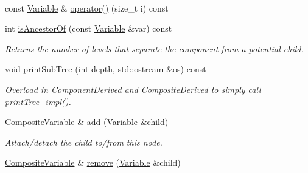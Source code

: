 \begin{DoxyCompactItemize}
$$\item 
const \hyperlink{classocra_1_1Variable}{Variable} \& \hyperlink{classocra_1_1CompositeVariable_ae539d99db2156258b02f6cf4474f2d94}{operator()} (size\+\_\+t i) const
\item 
int \hyperlink{classocra_1_1CompositeVariable_a6601ac71bdd683d06a7a6bfe4fa7252c}{is\+Ancestor\+Of} (const \hyperlink{classocra_1_1Variable}{Variable} \&var) const
\begin{DoxyCompactList}\small\item\em Returns the number of levels that separate the component from a potential child. \end{DoxyCompactList}\item 
void \hyperlink{classocra_1_1CompositeVariable_ac2015499d8f01ee39ef7bfbe33363a10}{print\+Sub\+Tree} (int depth, std\+::ostream \&os) const
\begin{DoxyCompactList}\small\item\em Overload in Component\+Derived and Composite\+Derived to simply call \hyperlink{classocra_1_1Composite_a99934c9b17849dd55075c4c773008dae}{print\+Tree\+\_\+impl()}. \end{DoxyCompactList}\end{DoxyCompactItemize}
{\bf }\par
\begin{DoxyCompactItemize}
\item 
\hyperlink{classocra_1_1CompositeVariable}{Composite\+Variable} \& \hyperlink{classocra_1_1CompositeVariable_a3915b8d93a37f7431ce682bdbf725758}{add} (\hyperlink{classocra_1_1Variable}{Variable} \&child)
\begin{DoxyCompactList}\small\item\em Attach/detach the child to/from this node. \end{DoxyCompactList}\item 
\hyperlink{classocra_1_1CompositeVariable}{Composite\+Variable} \& \hyperlink{classocra_1_1CompositeVariable_ada9e93c4f85c641e2ec8f1152c0b851a}{remove} (\hyperlink{classocra_1_1Variable}{Variable} \&child)
\end{DoxyCompactItemize}

